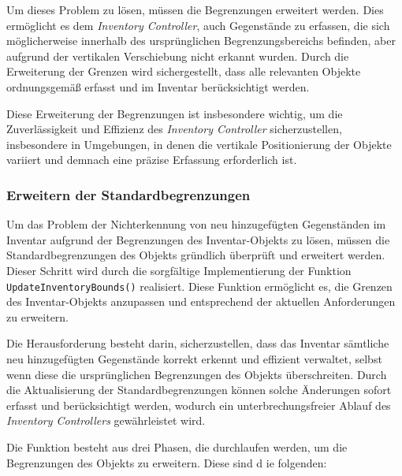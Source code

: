 Um dieses Problem zu lösen, müssen die Begrenzungen erweitert werden. Dies ermöglicht es dem \textit{Inventory Controller},
auch Gegenstände zu erfassen, die sich möglicherweise innerhalb des ursprünglichen Begrenzungsbereichs befinden, aber
aufgrund der vertikalen Verschiebung nicht erkannt wurden. Durch die Erweiterung der Grenzen wird sichergestellt, dass
alle relevanten Objekte ordnungsgemäß erfasst und im Inventar berücksichtigt werden.

Diese Erweiterung der Begrenzungen ist insbesondere wichtig, um die Zuverlässigkeit und Effizienz des \textit{Inventory Controller}
sicherzustellen, insbesondere in Umgebungen, in denen die vertikale Positionierung der Objekte variiert und demnach eine
präzise Erfassung erforderlich ist.

\subsubsection{Erweitern der Standardbegrenzungen}
Um das Problem der Nichterkennung von neu hinzugefügten Gegenständen im Inventar aufgrund der Begrenzungen des Inventar-Objekts
zu lösen, müssen die Standardbegrenzungen des Objekts gründlich überprüft und erweitert werden. Dieser Schritt wird
durch die sorgfältige Implementierung der Funktion \texttt{UpdateInventoryBounds()} realisiert. Diese Funktion ermöglicht
es, die Grenzen des Inventar-Objekts anzupassen und entsprechend der aktuellen Anforderungen zu erweitern.

Die Herausforderung besteht darin, sicherzustellen, dass das Inventar sämtliche neu hinzugefügten Gegenstände korrekt
erkennt und effizient verwaltet, selbst wenn diese die ursprünglichen Begrenzungen des Objekts überschreiten. Durch die
Aktualisierung der Standardbegrenzungen können solche Änderungen sofort erfasst und berücksichtigt werden, wodurch ein
unterbrechungsfreier Ablauf des \textit{Inventory Controllers} gewährleistet wird.

Die Funktion besteht aus drei Phasen, die durchlaufen werden, um die Begrenzungen des Objekts zu erweitern. Diese sind d
ie folgenden:


